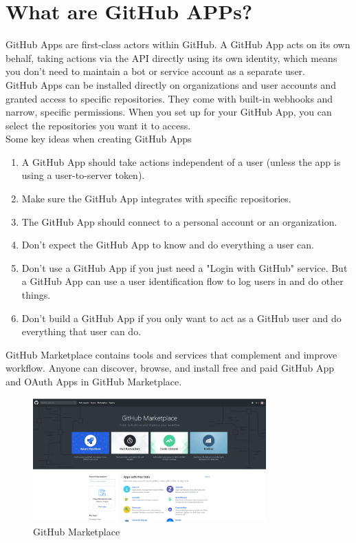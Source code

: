\documentclass[12pt,a4paper]{report}
\begin{document}
\section{What are GitHub APPs?}
GitHub Apps \cite{github_developer_guide} are first-class actors within GitHub. A GitHub App acts on its own behalf, taking actions via the API directly using its own identity, which means you don't need to maintain a bot or service account as a separate user.\\
GitHub Apps can be installed directly on organizations and user accounts and granted access to specific repositories. They come with built-in webhooks and narrow, specific permissions. When you set up for your GitHub App, you can select the repositories you want it to access.\\
Some key ideas when creating GitHub Apps
\begin{enumerate}
	\renewcommand{\labelenumi}{{\textbf{\arabic{enumi}.}}}
	\item A GitHub App should take actions independent of a user (unless the app is using a user-to-server token).
	\item Make sure the GitHub App integrates with specific repositories.
	\item The GitHub App should connect to a personal account or an organization.
	\item Don't expect the GitHub App to know and do everything a user can.
	\item Don't use a GitHub App if you just need a "Login with GitHub" service. But a GitHub App can use a user identification flow to log users in and do other things.
	\item Don't build a GitHub App if you only want to act as a GitHub user and do everything that user can do.
\end{enumerate}
GitHub Marketplace contains tools and services that complement and improve workflow. Anyone can discover, browse, and install free and paid GitHub App and OAuth Apps in GitHub Marketplace.
\begin{figure}[H]
	\centering
	\includegraphics[width=0.8\textwidth]{./pics/githubMarket.png}
	\caption{GitHub Marketplace}
\end{figure}
\end{document}
